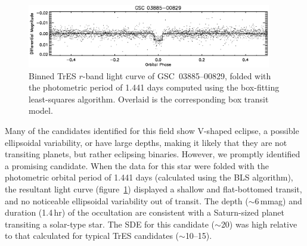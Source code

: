 \begin{figure}
\begin{center}
\includegraphics[width=0.95\textwidth]{3_f1}
\caption[TrES light curve of \mbox{GSC 03885--00829}, a blended eclipsing binary]{Binned TrES $r$-band light curve of \mbox{GSC 03885--00829},
  folded with the photometric period of 1.441 days computed using the
  box-fitting least-squares algorithm. Overlaid is the corresponding
  box transit model.}\label{cha:gsc:fig:discovery}
\end{center}
\end{figure}

Many of the candidates identified for this field show V-shaped
eclipse, a possible ellipsoidal variability, or have large depths,
making it likely that they are not transiting planets, but rather
eclipsing binaries.  However, we promptly identified a promising
candidate. When the data for this star were folded with the
photometric orbital period of 1.441 days (calculated using the BLS
algorithm), the resultant light curve (figure~\ref{cha:gsc:fig:discovery})
displayed a shallow and flat-bottomed transit, and no noticeable
ellipsoidal variability out of transit. The depth ($\sim$6\,mmag) and
duration (1.4\,hr) of the occultation are consistent with a
Saturn-sized planet transiting a solar-type star.  The SDE for this
candidate ($\sim$20) was high relative to that calculated for typical
TrES candidates ($\sim$10--15).

